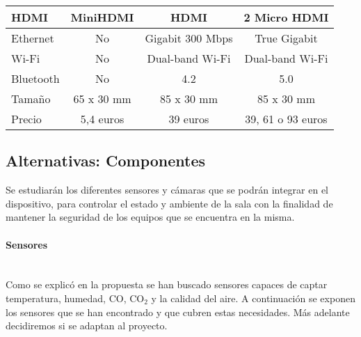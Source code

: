 \begin{table}[H]
{\begin{tabular}{|l|c|c|c|}
			\cellcolor[HTML]{BFBFBF}HDMI         & MiniHDMI                                           & HDMI                                               & 2 Micro HDMI                                      \\ \hline
			\cellcolor[HTML]{BFBFBF}Ethernet     & No                                                 & Gigabit 300 Mbps                                   & True Gigabit                                      \\ \hline
			\cellcolor[HTML]{BFBFBF}Wi-Fi        & No                                                 & Dual-band Wi-Fi                                    & Dual-band Wi-Fi                                   \\ \hline
			\cellcolor[HTML]{BFBFBF}Bluetooth    & No                                                 & 4.2                                                & 5.0                                               \\ \hline
			\cellcolor[HTML]{BFBFBF}Tamaño       & 65 x 30 mm                                         & 85 x 30 mm                                         & 85 x 30 mm                                        \\ \hline
			\cellcolor[HTML]{BFBFBF}Precio       & 5,4 euros                                          & 39 euros                                           & 39, 61 o 93 euros                                 \\ \hline
		\end{tabular}%
	}
\end{table}

\subsection{Alternativas: Componentes}\label{subsec:altComponentes}
Se estudiarán los diferentes sensores y cámaras que se podrán integrar en el dispositivo, para controlar el estado y ambiente de la sala con la finalidad de mantener la seguridad de los equipos que se encuentra en la misma.

\paragraph{Sensores}\mbox{} \\
Como se explicó en la propuesta se han buscado sensores capaces de captar temperatura, humedad, CO, CO$_2$ y la calidad del aire. A continuación se exponen los sensores que se han encontrado y que cubren estas necesidades. Más adelante decidiremos si se adaptan al proyecto.

